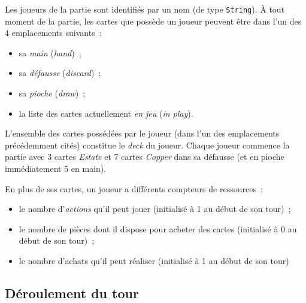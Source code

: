 \documentclass[12pt]{td}
\begin{document}
Les joueurs de la partie sont identifiés par un nom (de type \texttt{String}). À tout moment de la partie, les cartes que possède un joueur peuvent être dans l'un des 4 emplacements suivants~:
\begin{itemize}
	\item sa \emph{main} (\emph{hand})~;
	\item sa \emph{défausse} (\emph{discard})~;
	\item sa \emph{pioche} (\emph{draw})~;
	\item la liste des cartes actuellement \emph{en jeu} (\emph{in play}).
\end{itemize}

L'ensemble des cartes possédées par le joueur (dans l'un des emplacements précédemment cités) constitue le \emph{deck} du joueur. Chaque joueur commence la partie avec 3 cartes \emph{Estate} et 7 cartes \emph{Copper} dans sa défausse (et en pioche immédiatement 5 en main).

En plus de ses cartes, un joueur a différents compteurs de ressources~:
\begin{itemize}
	\item le nombre d'\emph{actions} qu'il peut jouer (initialisé à 1 au début de son tour)~;
	\item le nombre de pièces dont il dispose pour acheter des cartes (initialisé à 0 au début de son tour)~;
	\item le nombre d'achats qu'il peut réaliser (initialisé à 1 au début de son tour)
\end{itemize}

\subsection{Déroulement du tour}
\end{document}
